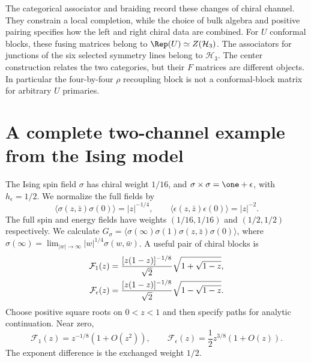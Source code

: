 The categorical associator and braiding record these changes of
chiral channel. They constrain a local completion, while the
choice of bulk algebra and positive pairing specifies how the
left and right chiral data are combined.
For $U$ conformal blocks, these fusing matrices belong to
$\Rep(U)\simeq Z(\mathcal H_3)$. The associators for junctions
of the six selected symmetry lines belong to $\mathcal H_3$.
The center construction relates the two categories, but their
$F$ matrices are different objects. In particular the four-by-four
$\rho$ recoupling block is not a conformal-block matrix for
arbitrary $U$ primaries.

\section{A complete two-channel example from the Ising model}
\label{sec:sewing-Ising}

The Ising spin field $\sigma$ has chiral weight $1/16$, and
$\sigma\times\sigma=\one+\epsilon$, with
$h_\epsilon=1/2$. We normalize the full fields by
\[
 \langle\sigma(z,\bar z)\sigma(0)\rangle=|z|^{-1/4},
 \qquad
 \langle\epsilon(z,\bar z)\epsilon(0)\rangle=|z|^{-2}.
\]
The full spin and energy fields have weights $(1/16,1/16)$
and $(1/2,1/2)$ respectively. We calculate
$G_\sigma=\langle\sigma(\infty)\sigma(1)\sigma(z,\bar z)
\sigma(0)\rangle$, where
$\sigma(\infty)=\lim_{|w|\to\infty}|w|^{1/4}\sigma(w,\bar w)$.
A useful pair of chiral blocks is
\begin{align}
 \mathcal F_1(z)&=\frac{[z(1-z)]^{-1/8}}{\sqrt2}
                         \sqrt{1+\sqrt{1-z}},\notag\\
 \mathcal F_\epsilon(z)&=\frac{[z(1-z)]^{-1/8}}{\sqrt2}
                         \sqrt{1-\sqrt{1-z}}.
 \label{eq:sewing-Ising-blocks}
\end{align}
Choose positive square roots on $0<z<1$ and then specify paths
for analytic continuation. Near zero,
\[
 \mathcal F_1(z)=z^{-1/8}(1+O(z^2)),\qquad
 \mathcal F_\epsilon(z)=\frac12z^{3/8}(1+O(z)).
\]
The exponent difference is the exchanged weight $1/2$.

